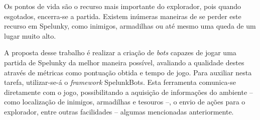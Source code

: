 Os pontos de vida são o recurso mais importante do explorador, pois quando
esgotados, encerra-se a partida. Existem inúmeras maneiras de se perder este
recurso em Spelunky, como inimigos, armadilhas ou até mesmo uma queda de um
lugar muito alto.

A proposta desse trabalho é realizar a criação de \textit{bots} capazes de
jogar uma partida de Spelunky da melhor maneira possível, avaliando a
qualidade destes através de métricas como pontuação obtida e tempo de jogo.
Para auxiliar nesta tarefa, utilizar-se-á o \textit{framework} SpelunkBots.
Esta ferramenta comunica-se diretamente com o jogo, possibilitando a aquisição
de informações do ambiente -- como localização de inimigos, armadilhas e
tesouros --, o envio de ações para o explorador, entre outras facilidades --
algumas mencionadas anteriormente.
